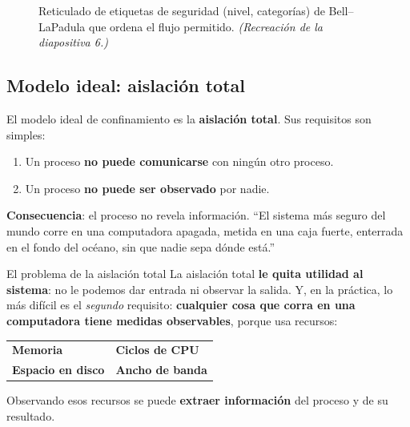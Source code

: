 \documentclass[11pt,a4paper]{article}
\begin{document}
\begin{figure}[h]
\centering
{}
\caption{Reticulado de etiquetas de seguridad (nivel, categorías) de Bell--LaPadula que ordena
el flujo permitido. \textit{(Recreación de la diapositiva 6.)}}
\end{figure}

\subsection{Modelo ideal: aislación total}
El modelo ideal de confinamiento es la \textbf{aislación total}. Sus requisitos son simples:
\begin{enumerate}[leftmargin=1.6em,itemsep=2pt]
  \item Un proceso \textbf{no puede comunicarse} con ningún otro proceso.
  \item Un proceso \textbf{no puede ser observado} por nadie.
\end{enumerate}
\textbf{Consecuencia}: el proceso no revela información. ``El sistema más seguro del mundo corre
en una computadora apagada, metida en una caja fuerte, enterrada en el fondo del océano, sin que
nadie sepa dónde está.''

\begin{warnbox}{El problema de la aislación total}
La aislación total \textbf{le quita utilidad al sistema}: no le podemos dar entrada ni observar
la salida. Y, en la práctica, lo más difícil es el \emph{segundo} requisito: \textbf{cualquier
cosa que corra en una computadora tiene medidas observables}, porque usa recursos:
\begin{center}
\begin{tabular}{ll}
\textbf{Memoria} & \textbf{Ciclos de CPU}\\
\textbf{Espacio en disco} & \textbf{Ancho de banda}\\
\end{tabular}
\end{center}
Observando esos recursos se puede \textbf{extraer información} del proceso y de su resultado.
\end{warnbox}
\end{document}

